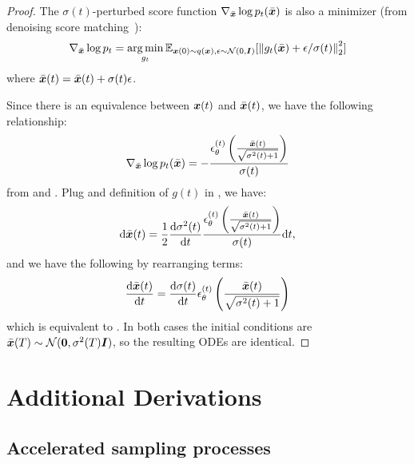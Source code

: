 \begin{proof}
The $\sigma(t)$-perturbed score function $\nabla_{\bar{{\bm{x}}}} \log p_t(\bar{{\bm{x}}})$ is also a minimizer (from denoising score matching~\citep{vincent2011connection}):
\begin{align}
    \nabla_{\bar{{\bm{x}}}} \log p_t = \operatorname*{arg\,min}_{g_t} {\mathbb{E}}_{{\bm{x}}(0) \sim q({\bm{x}}), \epsilon \sim {\mathcal{N}}(0, {\bm{I}})}[{\lVert {g_t(\bar{{\bm{x}}}) + \epsilon / \sigma(t)} \rVert}_2^2] \label{eq:dsm-ve}
\end{align}
where $\bar{{\bm{x}}}(t) = \bar{{\bm{x}}}(t) + \sigma(t) \epsilon$. 

Since there is an equivalence between ${\bm{x}}(t)$ and $\bar{{\bm{x}}}(t)$, we have the following relationship:
\begin{gather}
    \nabla_{\bar{{\bm{x}}}} \log p_t(\bar{{\bm{x}}}) = - \frac{\epsilon_\theta^{(t)}\left(\frac{\bar{{\bm{x}}}(t)}{\sqrt{\sigma^2(t) + 1}}\right)}{\sigma(t)} \label{eq:score-equivalence}
\end{gather}
from  and . Plug  and definition of $g(t)$ in , we have:
\begin{align}
    \mathrm{d} \bar{{\bm{x}}}(t) = \frac{1}{2} \frac{\mathrm{d} \sigma^2(t)}{\mathrm{d} t} \frac{\epsilon_\theta^{(t)}\left(\frac{\bar{{\bm{x}}}(t)}{\sqrt{\sigma^2(t) + 1}}\right)}{\sigma(t)} \mathrm{d} t,
\end{align}
and we have the following by rearranging terms:
\begin{align}
    \frac{\mathrm{d} \bar{{\bm{x}}}(t)}{\mathrm{d} t} = \frac{\mathrm{d} \sigma(t)}{\mathrm{d} t} \epsilon_\theta^{(t)}\left(\frac{\bar{{\bm{x}}}(t)}{\sqrt{\sigma^2(t) + 1}}\right)
\end{align}
which is equivalent to . In both cases the initial conditions are $\bar{{\bm{x}}}(T) \sim {\mathcal{N}}({\bm{0}}, \sigma^2(T) {\bm{I}})$, so the resulting ODEs are identical.
\end{proof}
\section{Additional Derivations}
\subsection{Accelerated sampling processes}
\label{app:acceleration}

